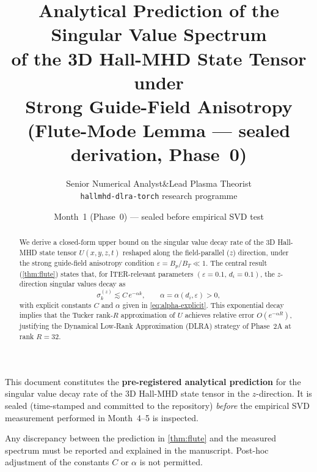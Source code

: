 \documentclass[12pt, a4paper]{article}
\newcommand{\di}{d_i}
\newcommand{\eps}{\varepsilon}
\newcommand{\BT}{B_T}
\newcommand{\Bp}{B_p}
\newcommand{\sigk}{\sigma_k}
\begin{document}
\title{%
  \textbf{Analytical Prediction of the Singular Value Spectrum}\\[4pt]
  \large of the 3D Hall-MHD State Tensor under\\
  Strong Guide-Field Anisotropy\\[6pt]
  \normalsize (Flute-Mode Lemma — sealed derivation, Phase~0)
}

\author{%
  Senior Numerical Analyst\quad\&\quad Lead Plasma Theorist\\[2pt]
  \small \texttt{hallmhd-dlra-torch} research programme
}

\date{Month~1 (Phase~0) — sealed before empirical SVD test}

\maketitle
\thispagestyle{empty}

\begin{prereg}
This document constitutes the \textbf{pre-registered analytical prediction}
for the singular value decay rate of the 3D Hall-MHD state tensor in the
$z$-direction.  It is sealed (time-stamped and committed to the repository)
\emph{before} the empirical SVD measurement performed in Month~4--5 is
inspected.

Any discrepancy between the prediction in \cref{thm:flute} and the
measured spectrum must be reported and explained in the manuscript.
Post-hoc adjustment of the constants $C$ or $\alpha$ is not permitted.
\end{prereg}

\begin{abstract}
We derive a closed-form upper bound on the singular value decay rate of the
3D Hall-MHD state tensor $U(x,y,z,t)$ reshaped along the field-parallel
($z$) direction, under the strong guide-field anisotropy condition
$\eps = \Bp/\BT \ll 1$.  The central result
(\cref{thm:flute}) states that, for ITER-relevant parameters
$(\eps = 0.1,\, \di = 0.1)$, the $z$-direction singular values decay as
\[
  \sigk^{(z)} \lesssim C\,e^{-\alpha k}, \qquad
  \alpha = \alpha(\di,\eps) > 0,
\]
with explicit constants $C$ and $\alpha$ given in \cref{eq:alpha-explicit}.
This exponential decay implies that the Tucker rank-$R$ approximation of
$U$ achieves relative error $O(e^{-\alpha R})$, justifying the Dynamical
Low-Rank Approximation (DLRA) strategy of Phase~2A at rank $R = 32$.
\end{abstract}
\end{document}
